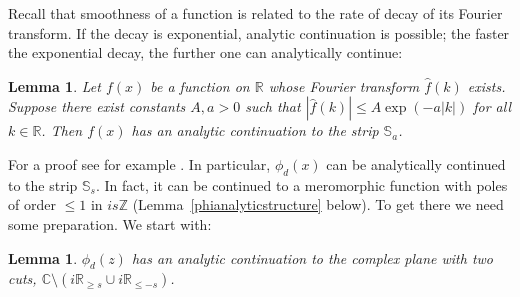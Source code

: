 \documentclass[12pt]{article}
\theoremstyle{plain}
\newtheorem{lemma}[theorem]{Lemma}
\theoremstyle{definition}
\numberwithin{equation}{section}
\numberwithin{theorem}{section}
\begin{document}
Recall that smoothness of a function is related to the rate of decay of its Fourier transform. If the decay is exponential, analytic continuation is possible; the faster the exponential decay, the further one can analytically continue: 

\begin{lemma} \label{fourieranalytic} Let $f(x)$ be a function on $\mathbb{R}$ whose Fourier transform $\hat{f}(k)$ exists. Suppose there exist constants $A,a>0$ such that $|\hat{f}(k)|\leq A\exp(-a|k|)$ for all $k\in\mathbb{R}$. Then $f(x)$ has an analytic continuation to the strip $\mathbb{S}_a$.
\end{lemma}


	For a proof see for example \cite[Ch.\,4,\,Thm.\,3.1]{SteinShakarchi}.
In particular, $\phi_d(x)$ can be analytically continued to the strip $\mathbb{S}_s$. 
In fact, it can be continued to a meromorphic function with poles of order $\le 1$ in $is\mathbb{Z}$ (Lemma~\ref{phianalyticstructure} below). To get there we need some preparation. We start with:

\begin{lemma} \label{phianalyticcontinuation} $\phi_d(z)$ has an analytic continuation to the complex plane with two cuts, 
$\mathbb{C}\setminus (i\mathbb{R}_{\geq s}\cup i\mathbb{R}_{\leq -s})$.
\end{lemma}
\end{document}

